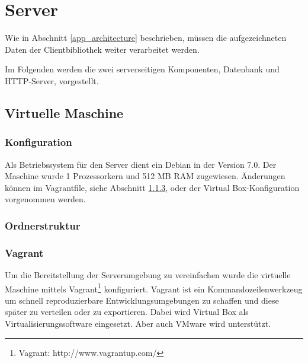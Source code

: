 \section{Server}
\label{server}
Wie in Abschnitt \ref{app_architecture} beschrieben, müssen die aufgezeichneten Daten der Clientbibliothek weiter verarbeitet werden. %

Im Folgenden werden die zwei serverseitigen Komponenten, Datenbank und HTTP-Server, vorgestellt. 


\subsection{Virtuelle Maschine}

\subsubsection{Konfiguration}

Als Betriebssystem für den Server dient ein Debian in der Version 7.0. Der Maschine wurde 1 Prozessorkern und 512 MB RAM zugewiesen. Änderungen können im Vagrantfile, siehe Abschnitt \ref{vagrant}, oder der Virtual Box-Konfiguration vorgenommen werden.

\subsubsection{Ordnerstruktur}
\subsubsection{Vagrant}
\label{vagrant}
Um die Bereitstellung der Serverumgebung zu vereinfachen wurde die virtuelle Maschine mittels Vagrant\footnote{Vagrant: http://www.vagrantup.com/} konfiguriert. Vagrant ist ein Kommandozeilenwerkzeug um schnell reproduzierbare Entwicklungsumgebungen zu schaffen und diese später zu verteilen oder zu exportieren. Dabei wird Virtual Box als Virtualisierungssoftware eingesetzt. Aber auch VMware wird unterstützt. 

